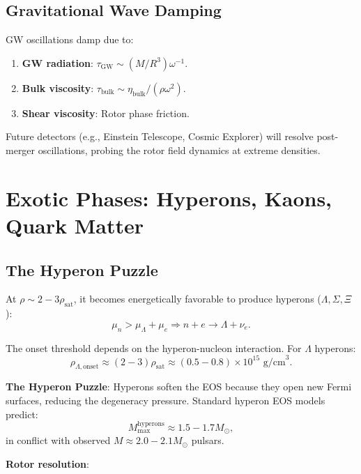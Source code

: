 \documentclass[12pt,a4paper]{article}
\theoremstyle{definition}
\theoremstyle{remark}
\begin{document}
\subsection{Gravitational Wave Damping}

GW oscillations damp due to:
\begin{enumerate}
\item \textbf{GW radiation}: $\tau_{\text{GW}} \sim (M/R^3) \omega^{-1}$.
\item \textbf{Bulk viscosity}: $\tau_{\text{bulk}} \sim \eta_{\text{bulk}} / (\rho \omega^2)$.
\item \textbf{Shear viscosity}: Rotor phase friction.
\end{enumerate}

Future detectors (e.g., Einstein Telescope, Cosmic Explorer) will resolve post-merger oscillations, probing the rotor field dynamics at extreme densities.

\section{Exotic Phases: Hyperons, Kaons, Quark Matter}

\subsection{The Hyperon Puzzle}

At $\rho \sim 2-3 \rho_{\text{sat}}$, it becomes energetically favorable to produce hyperons ($\Lambda, \Sigma, \Xi$):
\begin{equation}
\mu_n > \mu_{\Lambda} + \mu_e \Rightarrow n + e \to \Lambda + \nu_e.
\end{equation}

The onset threshold depends on the hyperon-nucleon interaction. For $\Lambda$ hyperons:
\begin{equation}
\rho_{\Lambda,\text{onset}} \approx (2-3) \rho_{\text{sat}} \approx (0.5-0.8) \times 10^{15} \text{ g/cm}^3.
\end{equation}

\textbf{The Hyperon Puzzle}: Hyperons soften the EOS because they open new Fermi surfaces, reducing the degeneracy pressure. Standard hyperon EOS models predict:
\begin{equation}
M_{\text{max}}^{\text{hyperons}} \approx 1.5-1.7 M_\odot,
\end{equation}
in conflict with observed $M \approx 2.0-2.1 M_\odot$ pulsars.

\textbf{Rotor resolution}:
\end{document}
